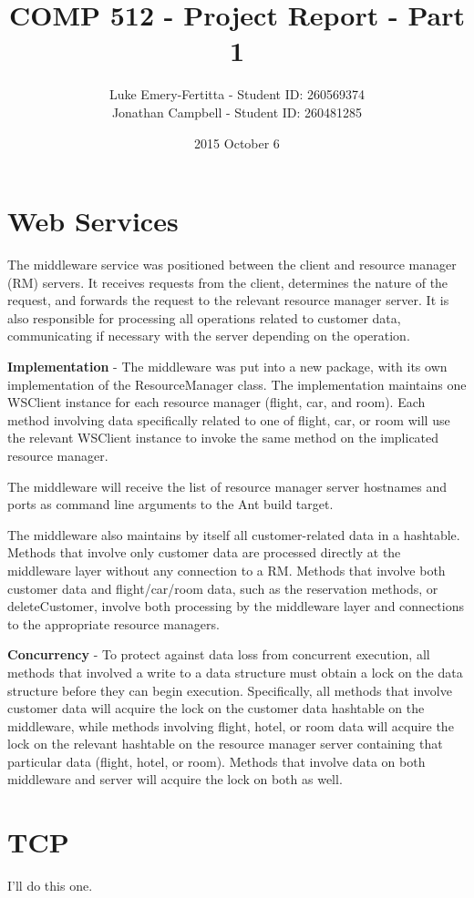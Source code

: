 \documentclass[11pt]{article}
\begin{document}
\title{COMP 512 - Project Report - Part 1}
\author{Luke Emery-Fertitta - Student ID: 260569374 \\ Jonathan Campbell - Student ID: 260481285}
\date{2015 October 6}
\maketitle

\section{Web Services}

The middleware service was positioned between the client and resource manager (RM) servers. It receives requests from the client, determines the nature of the request, and forwards the request to the relevant resource manager server. It is also responsible for processing all operations related to customer data, communicating if necessary with the server depending on the operation.

\textbf{Implementation} - The middleware was put into a new package, with its own implementation of the ResourceManager class. The implementation maintains one WSClient instance for each resource manager (flight, car, and room). Each method involving data specifically related to one of flight, car, or room will use the relevant WSClient instance to invoke the same method on the implicated resource manager.

The middleware will receive the list of resource manager server hostnames and ports as command line arguments to the Ant build target.

The middleware also maintains by itself all customer-related data in a hashtable. Methods that involve only customer data are processed directly at the middleware layer without any connection to a RM. Methods that involve both customer data and flight/car/room data, such as the reservation methods, or deleteCustomer, involve both processing by the middleware layer and connections to the appropriate resource managers.

\textbf{Concurrency} - To protect against data loss from concurrent execution, all methods that involved a write to a data structure must obtain a lock on the data structure before they can begin execution. Specifically, all methods that involve customer data will acquire the lock on the customer data hashtable on the middleware, while methods involving flight, hotel, or room data will acquire the lock on the relevant hashtable on the resource manager server containing that particular data (flight, hotel, or room). Methods that involve data on both middleware and server will acquire the lock on both as well.

\section{TCP}

I'll do this one. \par
\end{document}
